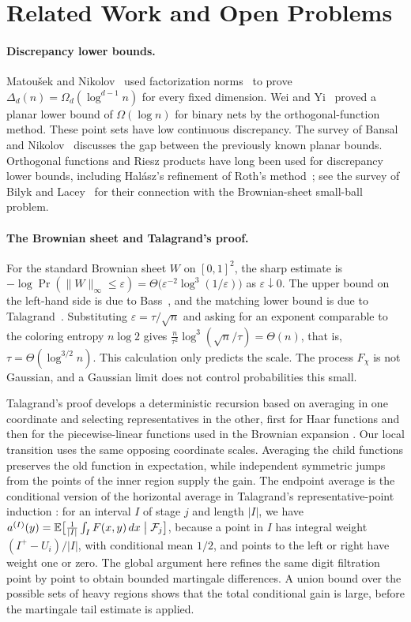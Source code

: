 \documentclass[11pt,letterpaper]{article}
\newcommand{\E}{\mathbb{E}}
\newcommand{\F}{\mathcal{F}}
\newcommand{\1}{\mathbf{1}}
\newcommand{\Fnorm}[1]{\lVert #1\rVert_\infty}
\newcommand{\eps}{\varepsilon}
\begin{document}
\section{Related Work and Open Problems}\label{sec:related}

\paragraph{Discrepancy lower bounds.}
Matou\v{s}ek and Nikolov~\cite{MN15} used factorization norms~\cite{MNT20} to prove \mbox{$\Delta_d(n)=\Omega_d(\log^{d-1}n)$} for every fixed dimension. Wei and Yi~\cite{WY13} proved a planar lower bound of $\Omega(\log n)$ for binary nets by the orthogonal-function method. These point sets have low continuous discrepancy. The survey of Bansal and Nikolov~\cite{BN26} discusses the gap between the previously known planar bounds. Orthogonal functions and Riesz products have long been used for discrepancy lower bounds, including Hal\'asz's refinement of Roth's method~\cite{Hal81}; see the survey of Bilyk and Lacey~\cite{BL13} for their connection with the Brownian-sheet small-ball problem.

\paragraph{The Brownian sheet and Talagrand's proof.}
For the standard Brownian sheet $W$ on $[0,1]^2$, the sharp estimate is $-\log\Pr(\Fnorm W\le\eps)=\Theta\bigl(\eps^{-2}\log^3(1/\eps)\bigr)$ as $\eps\downarrow0$. The upper bound on the left-hand side is due to Bass~\cite{Bas88}, and the matching lower bound is due to Talagrand~\cite{Tal94}. Substituting $\eps=\tau/\sqrt n$ and asking for an exponent comparable to the coloring entropy $n\log2$ gives $\frac n{\tau^2}\log^3(\sqrt n/\tau)=\Theta(n)$, that is, $\tau=\Theta(\log^{3/2}n)$. This calculation only predicts the scale. The process $F_\chi$ is not Gaussian, and a Gaussian limit does not control probabilities this small.

Talagrand's proof develops a deterministic recursion based on averaging in one coordinate and selecting representatives in the other, first for Haar functions and then for the piecewise-linear functions used in the Brownian expansion \cite[Proposition~3.2 and Theorem~3.1]{Tal94}. Our local transition uses the same opposing coordinate scales. Averaging the child functions preserves the old function in expectation, while independent symmetric jumps from the points of the inner region supply the gain. The endpoint average is the conditional version of the horizontal average in Talagrand's representative-point induction \cite[proof of Proposition~3.2]{Tal94}: for an interval $I$ of stage $j$ and length $|I|$, we have $a^{(I)}(y)=\E\bigl[\frac1{|I|}\int_IF(x,y)\,dx\bigm|\F_j\bigr]$, because a point in $I$ has integral weight $(I^+-U_i)/|I|$, with conditional mean $1/2$, and points to the left or right have weight one or zero. The global argument here refines the same digit filtration point by point to obtain bounded martingale differences. A union bound over the possible sets of heavy regions shows that the total conditional gain is large, before the martingale tail estimate is applied.
\end{document}
